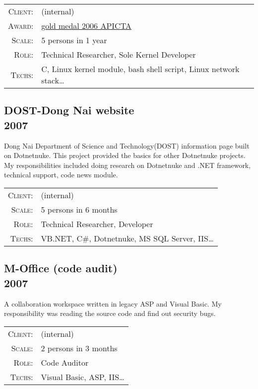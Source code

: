 \documentclass[a4paper,10pt]{article}
\begin{document}
\begin{tabular}{rl}
    \textsc{Client:} & \small(internal) \\
    \textsc{Award:} & \href{http://www.apicta.org/winners/2006-macao-sar}{gold medal 2006 APICTA}\\
    \textsc{Scale:} & 5 persons in 1 year\\
    \textsc{Role:} & Technical Researcher, Sole Kernel Developer\\
    \textsc{Techs:} & C, Linux kernel module, bash shell script, Linux network stack\ldots\\
\end{tabular}

\subsection*{DOST-Dong Nai website\\\small 2007}

Dong Nai Department of Science and Technology(DOST) information page built on Dotnetnuke.
This project provided the basics for other Dotnetnuke projects.
My responsibilities included doing research on Dotnetnuke and .NET framework, technical support, code news module.

\begin{tabular}{rl}
    \textsc{Client:} & \small(internal) \\
    \textsc{Scale:} & 5 persons in 6 months\\
    \textsc{Role:} & Technical Researcher, Developer\\
    \textsc{Techs:} & VB.NET, C\#, Dotnetnuke, MS SQL Server, IIS\ldots\\
\end{tabular}

\subsection*{M-Office (code audit)\\\small 2007}

A collaboration workspace written in legacy ASP and Visual Basic.
My responsibility was reading the source code and find out security bugs.

\begin{tabular}{rl}
    \textsc{Client:} & \small(internal) \\
    \textsc{Scale:} & 2 persons in 3 months\\
    \textsc{Role:} & Code Auditor\\
    \textsc{Techs:} & Visual Basic, ASP, IIS\ldots\\
\end{tabular}
\end{document}
